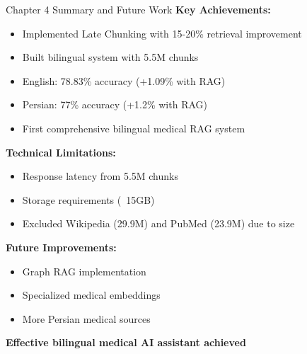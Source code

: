 \begin{frame}{Chapter 4 Summary and Future Work}
    \textbf{Key Achievements:}
    \begin{itemize}
        \item Implemented Late Chunking with 15-20\% retrieval improvement
        \item Built bilingual system with 5.5M chunks
        \item English: 78.83\% accuracy (+1.09\% with RAG)
        \item Persian: 77\% accuracy (+1.2\% with RAG)
        \item First comprehensive bilingual medical RAG system
    \end{itemize}
    
    \vspace{0.5em}
    
    \textbf{Technical Limitations:}
    \begin{itemize}
        \item Response latency from 5.5M chunks
        \item Storage requirements (~15GB)
        \item Excluded Wikipedia (29.9M) and PubMed (23.9M) due to size
    \end{itemize}
    
    \vspace{0.5em}
    
    \textbf{Future Improvements:}
    \begin{itemize}
        \item Graph RAG implementation
        \item Specialized medical embeddings
        \item More Persian medical sources
    \end{itemize}
    
    \begin{center}
        \colorbox{highlight!20}{\textbf{Effective bilingual medical AI assistant achieved}}
    \end{center}
\end{frame}
